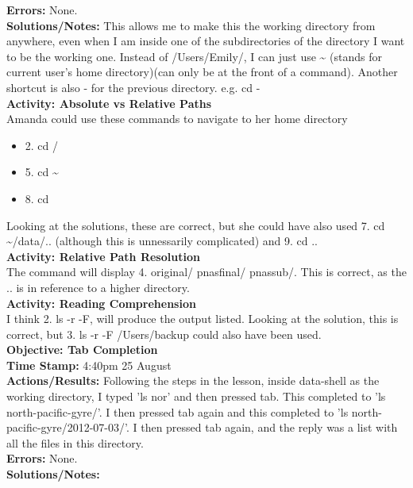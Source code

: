 \documentclass{article}
\begin{document}
\begin{FlushLeft}
\textbf{Errors:} None.\\
\textbf{Solutions/Notes:} This allows me to make this the working directory from anywhere, even when I am inside one of the subdirectories of the directory I want to be the working one. Instead of /Users/Emily/, I can just use \~{} (stands for current user's home directory)(can only be at the front of a command). Another shortcut is also - for the previous directory. e.g. cd -\\
\vspace{5mm}
\textbf{Activity: Absolute vs Relative Paths}\\ 
Amanda could use these commands to navigate to her home directory
\begin{itemize}
    \item 2. cd /
    \item 5. cd \~{}
    \item 8. cd
\end{itemize}
Looking at the solutions, these are correct, but she could have also used 7. cd \~{}/data/.. (although this is unnessarily complicated) and 9. cd ..\\
\vspace{5mm}
\textbf{Activity: Relative Path Resolution}\\
The command will display 4. original/ pnas\textunderscore final/ pnas\textunderscore sub/. This is correct, as the .. is in reference to a higher directory.\\
\vspace{5mm}
\textbf{Activity: Reading Comprehension}\\
I think 2. ls -r -F, will produce the output listed. Looking at the solution, this is correct, but 3. ls -r -F /Users/backup could also have been used.\\
\vspace{5mm}
\textbf{Objective: Tab Completion}\\ 
\textbf{Time Stamp:} 4:40pm 25 August\\
\textbf{Actions/Results:} Following the steps in the lesson, inside data-shell as the working directory, I typed 'ls nor' and then pressed tab. This completed to 'ls north-pacific-gyre/'. I then pressed tab again and this completed to 'ls north-pacific-gyre/2012-07-03/'. I then pressed tab again, and the reply was a list with all the files in this directory.\\
\textbf{Errors:} None.\\
\textbf{Solutions/Notes:}\\
\vspace{5mm}


\end{FlushLeft}
\end{document}
